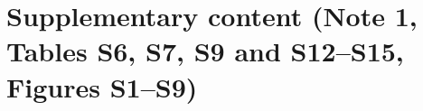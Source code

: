 \clearpage
\section*{Supplementary content (Note 1, Tables S6, S7, S9 and S12--S15, Figures S1--S9)}

\clearpage

\clearpage

\clearpage

\clearpage

\clearpage

\clearpage

\clearpage

\clearpage

